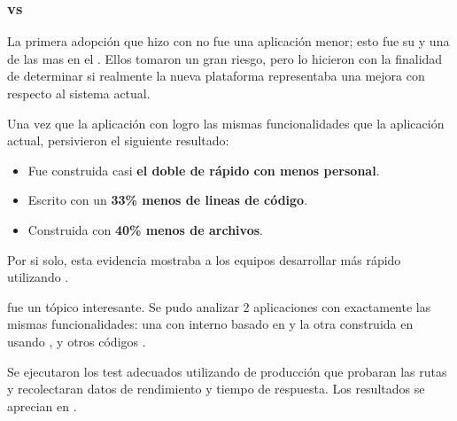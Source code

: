 \subsubsection{\nodejsNAME vs \javaNAME \cite{online_nodejs_paypal}}



La primera adopción que hizo \paypalNAME con \nodejsNAME no fue una aplicación menor; esto fue su \accountOverviewPageINT y una de las mas \traffickedINT \appsINT en el \websiteINT. Ellos tomaron un gran riesgo, pero lo hicieron con la finalidad de determinar si realmente la nueva plataforma representaba una mejora con respecto al sistema actual.

Una vez que la aplicación con \nodejsNAME logro las mismas funcionalidades que la aplicación actual, persivieron el siguiente resultado:

\begin{itemize}
\item Fue construida casi \textbf{el doble de rápido con menos personal}.
\item Escrito con un \textbf{33\% menos de lineas de código}.
\item Construida con \textbf{40\% menos de archivos}.
\end{itemize}

Por si solo, esta evidencia mostraba a los equipos desarrollar más rápido utilizando \javaScriptNAME.

\performanceQA fue un tópico interesante. Se pudo analizar 2 aplicaciones con exactamente las mismas funcionalidades: una con \frameworkPC \javaNAME interno basado en \javaSpringNAME y la otra construida en \krakenjsNAME usando \expressjsNAME, \dustjsNAME y otros códigos \openSourcePC.

Se ejecutaron los test adecuados utilizando \hardwarePC de producción que probaran las rutas y recolectaran datos de rendimiento y tiempo de respuesta. Los resultados se aprecian en .

